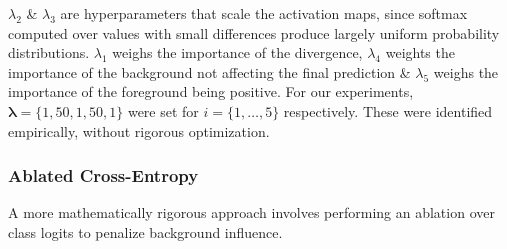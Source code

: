 \documentclass{article}
\begin{document}
$\lambda_2$ \& $\lambda_3$ are hyperparameters that scale the activation maps, since softmax computed over values with small differences produce largely uniform probability distributions. $\lambda_1$ weighs the importance of the divergence, $\lambda_4$ weights the importance of the background not affecting the final prediction \& $\lambda_5$ weighs the importance of the foreground being positive. For our experiments, $\bm{\lambda} = \{1, 50, 1, 50, 1\}$ were set for $i = \{1, \ldots, 5\}$ respectively. These were identified empirically, without rigorous optimization.

\subsubsection{Ablated Cross-Entropy}

A more mathematically rigorous approach involves performing an ablation over class logits to penalize background influence.
\end{document}
